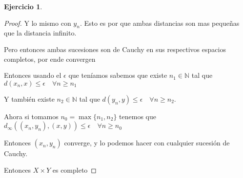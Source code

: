 \documentclass[11pt]{report}
\newcommand{\N}{\mathbb{N}}
\theoremstyle{definition}
\newtheorem{ej}{Ejercicio}
\begin{document}
\begin{ej}
\begin{proof}
			Y lo mismo con $y_n$. Esto es por que ambas distancias son mas pequeñas que la distancia infinito.

			Pero entonces ambas sucesiones son de Cauchy en sus respectivos espacios completos, por ende convergen

			Entonces usando el $\epsilon$ que teníamos sabemos que existe $n_1 \in \N$ tal que $d(x_n,x) \leq \epsilon \quad \forall n\geq n_1$ 

			Y también existe $n_2 \in \N$ tal que $d(y_n,y) \leq \epsilon \quad \forall n\geq n_2$.

			Ahora si tomamos $n_0 = \max\{n_1,n_2\}$ tenemos que $d_{\infty}((x_n,y_n),(x,y)) \leq \epsilon \quad \forall n \geq n_0$

			Entonces $(x_n,y_n)$ converge, y lo podemos hacer con cualquier sucesión de Cauchy.

			Entonces $X\times Y$ es completo
		\end{proof}
	\end{ej}
\end{document}
